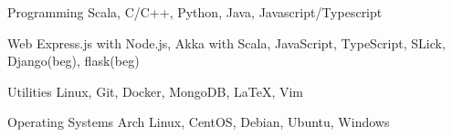 \begin{cvskills}

  \cvskill
  {Programming}
  {Scala, C/C++, Python, Java, Javascript/Typescript}

  \cvskill
  {Web}
  {Express.js with Node.js, Akka with Scala, JavaScript, TypeScript, SLick, Django(beg), flask(beg)}

  \cvskill
  {Utilities}
  {Linux, Git, Docker,
    MongoDB, \LaTeX, Vim}
    
    \cvskill
    {Operating Systems}
    {Arch Linux, CentOS, Debian, Ubuntu, Windows }    

\end{cvskills}

